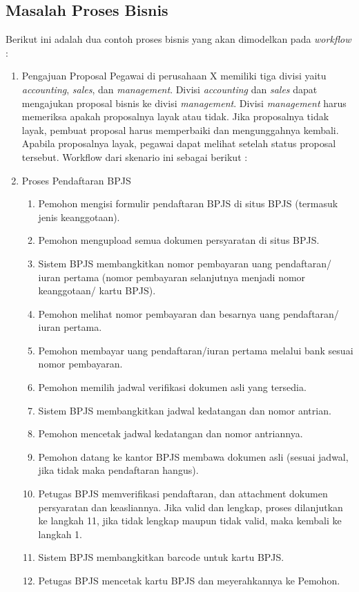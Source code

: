 \subsection{Masalah Proses Bisnis}
\label{hasilstudi_bpmn_masalah}
Berikut ini adalah dua contoh proses bisnis yang akan dimodelkan pada \textit{workflow} :
\begin{enumerate}
\item Pengajuan Proposal
Pegawai di perusahaan X memiliki tiga divisi yaitu \textit{accounting}, \textit{sales}, dan \textit{management}. Divisi \textit{accounting} dan \textit{sales} dapat mengajukan proposal bisnis ke divisi \textit{management}. Divisi \textit{management} harus memeriksa apakah proposalnya layak atau tidak. Jika proposalnya tidak layak, pembuat proposal harus memperbaiki dan mengunggahnya kembali. Apabila proposalnya layak, pegawai dapat melihat setelah status proposal tersebut. Workflow dari skenario ini sebagai berikut :


\item Proses Pendaftaran BPJS
\begin{enumerate}
	\item Pemohon mengisi formulir pendaftaran BPJS di situs BPJS (termasuk jenis keanggotaan).
	\item Pemohon mengupload semua dokumen persyaratan di situs BPJS.
	\item Sistem BPJS membangkitkan nomor pembayaran uang pendaftaran/ iuran pertama (nomor pembayaran selanjutnya menjadi nomor keanggotaan/ kartu BPJS).
  \item Pemohon melihat nomor pembayaran dan besarnya uang pendaftaran/ iuran pertama.
  \item Pemohon membayar uang pendaftaran/iuran pertama melalui bank sesuai nomor pembayaran.
  \item Pemohon memilih jadwal verifikasi dokumen asli yang tersedia.
  \item Sistem BPJS membangkitkan jadwal kedatangan dan nomor antrian.
  \item Pemohon mencetak jadwal kedatangan dan nomor antriannya.
  \item Pemohon datang ke kantor BPJS membawa dokumen asli (sesuai jadwal, jika tidak maka pendaftaran hangus). 
  \item Petugas BPJS memverifikasi pendaftaran, dan attachment dokumen persyaratan dan keasliannya. Jika valid dan lengkap, proses dilanjutkan ke langkah 11, jika tidak lengkap maupun tidak valid, maka kembali ke langkah 1.
	\item Sistem BPJS membangkitkan barcode untuk kartu BPJS.
  \item Petugas BPJS mencetak kartu BPJS dan meyerahkannya ke Pemohon.
\end{enumerate}

\end{enumerate}
		


